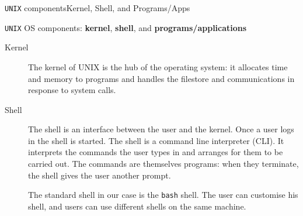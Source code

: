 \begin{frame}{\texttt{UNIX} components}{Kernel, Shell, and Programs/Apps}
  \begin{block}{\texttt{UNIX} OS components: \textbf{kernel}, \textbf{shell}, and \textbf{programs/applications}}
    \begin{description}%
  \item[Kernel]  {\footnotesize The kernel of UNIX is the hub of the operating system: it allocates time and memory to programs and handles the filestore and communications in response to system calls. }

  \item[Shell]  {\footnotesize The shell is an interface between the user and the kernel. Once a user logs in the shell is started. The shell is a command line interpreter (CLI). It interprets the commands the user types in and arranges for them to be carried out. The commands are themselves programs: when they terminate, the shell gives the user another prompt.}

    {\footnotesize The standard shell in our case is the \alert{\texttt{bash}} shell. The user can customise his shell, and users can use different shells on the same machine.}

  \end{description}

    \end{block}
\end{frame}
